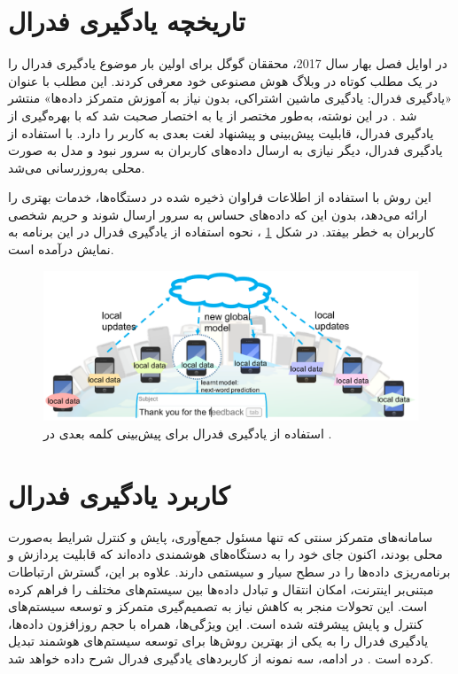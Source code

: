 \section{تاریخچه یادگیری فدرال}


در اوایل فصل بهار سال 2017، محققان گوگل
برای اولین بار موضوع یادگیری فدرال را در یک مطلب کوتاه در وبلاگ هوش مصنوعی خود معرفی کردند. این مطلب با عنوان «یادگیری فدرال: یادگیری ماشین اشتراکی، بدون نیاز به آموزش متمرکز داده‌ها» منتشر شد
\cite{mcmahan2017federated}.
در این نوشته، به‌طور مختصر از
یا به اختصار
صحبت شد که با بهره‌گیری از یادگیری فدرال، قابلیت پیش‌بینی و پیشنهاد لغت بعدی به کاربر را دارد. با استفاده از یادگیری فدرال، دیگر نیازی به ارسال داده‌های کاربران به سرور نبود و مدل به ‌صورت محلی به‌روزرسانی می‌شد.

این روش با استفاده از اطلاعات فراوان ذخیره شده در دستگاه‌ها، خدمات بهتری را ارائه می‌دهد، بدون این که داده‌های حساس به سرور ارسال شوند و حریم شخصی کاربران به خطر بیفتد. در شکل
\ref{gboard}%
، نحوه استفاده از یادگیری فدرال در این برنامه به نمایش درآمده است.


 \begin{figure}[t!]
	\centering
	\includegraphics[scale=1]{images/chap1/gboard.png}%
	\caption{%
استفاده از یادگیری فدرال برای پیش‌بینی کلمه بعدی در
		\cite{li2020federated}%
		.
	}
	\label{gboard}
	\centering
\end{figure}



\section{کاربرد یادگیری فدرال}
سامانه‌های متمرکز سنتی که تنها مسئول جمع‌آوری، پایش و کنترل شرایط به‌صورت محلی بودند، اکنون جای خود را به دستگاه‌های هوشمندی داده‌اند که قابلیت پردازش و برنامه‌ریزی داده‌ها را در سطح سیار و سیستمی دارند. علاوه بر این، گسترش ارتباطات مبتنی‌بر اینترنت، امکان انتقال و تبادل داده‌ها بین سیستم‌های مختلف را فراهم کرده است. این تحولات منجر به کاهش نیاز به تصمیم‌گیری متمرکز و توسعه سیستم‌های کنترل و پایش پیشرفته شده است. این ویژگی‌ها، همراه با حجم روزافزون داده‌ها، یادگیری فدرال را به یکی از بهترین روش‌ها برای توسعه سیستم‌های هوشمند تبدیل کرده است
\cite{mahtab2022algorithm}.
در ادامه، سه نمونه از کاربردهای یادگیری فدرال شرح داده خواهد شد.


